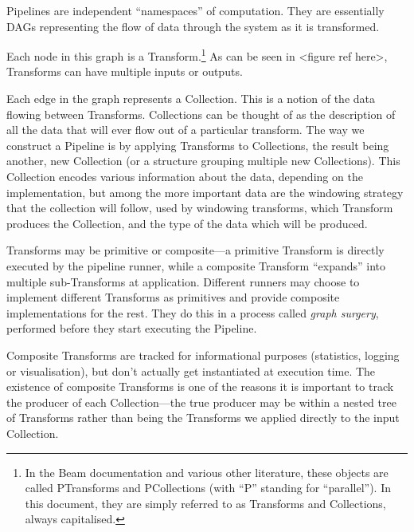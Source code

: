 
Pipelines are independent ``namespaces'' of computation.
They are essentially DAGs representing the flow of data through the system as it is transformed.

Each node in this graph is a Transform.\footnote
{
In the Beam documentation and various other literature, these objects are called PTransforms and PCollections (with ``P'' standing for ``parallel'').
In this document, they are simply referred to as Transforms and Collections, always capitalised.
}
As can be seen in <figure ref here>, Transforms can have multiple inputs or outputs.

Each edge in the graph represents a Collection.
This is a notion of the data flowing between Transforms.
Collections can be thought of as the description of all the data that will ever flow out of a particular transform.
The way we construct a Pipeline is by applying Transforms to Collections, the result being another, new Collection (or a structure grouping multiple new Collections).
This Collection encodes various information about the data, depending on the implementation, but among the more important data are the windowing strategy that the collection will follow, used by windowing transforms, which Transform produces the Collection, and the type of the data which will be produced.

Transforms may be primitive or composite---a primitive Transform is directly executed by the pipeline runner, while a composite Transform ``expands'' into multiple sub-Transforms at application.
Different runners may choose to implement different Transforms as primitives and provide composite implementations for the rest.
They do this in a process called \emph{graph surgery}, performed before they start executing the Pipeline.

Composite Transforms are tracked for informational purposes (statistics, logging or visualisation), but don't actually get instantiated at execution time.
The existence of composite Transforms is one of the reasons it is important to track the producer of each Collection---the true producer may be within a nested tree of Transforms rather than being the Transforms we applied directly to the input Collection.



